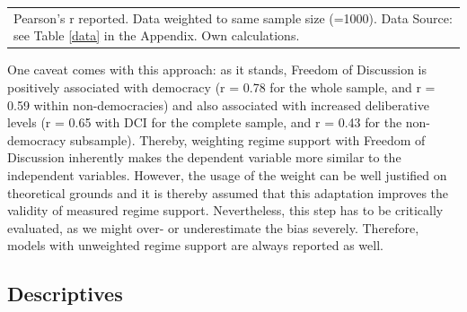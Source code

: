 \documentclass[]{article}
\begin{document}
\begin{table}[!htb]
{\begin{tabular}{@{}lcccl@{}}
            \multicolumn{5}{l}{%
                \begin{minipage}{20cm}%
                    \flushright
                    \scriptsize Pearson's r reported. Data weighted to same sample size (=1000). Data Source: see Table \ref{data} in the Appendix. Own calculations.%
                \end{minipage}%
            }
        \end{tabular}
    }
\end{table}

One caveat comes with this approach: as it stands, Freedom of Discussion
is positively associated with democracy (r = 0.78 for the whole sample,
and r = 0.59 within non-democracies) and also associated with increased
deliberative levels (r = 0.65 with DCI for the complete sample, and r =
0.43 for the non-democracy subsample). Thereby, weighting regime support
with Freedom of Discussion inherently makes the dependent variable more
similar to the independent variables. However, the usage of the weight
can be well justified on theoretical grounds and it is thereby assumed
that this adaptation improves the validity of measured regime support.
Nevertheless, this step has to be critically evaluated, as we might
over- or underestimate the bias severely. Therefore, models with
unweighted regime support are always reported as well.

\subsection{Descriptives} \label{descr_section}
\end{document}
